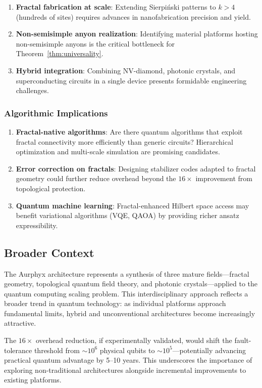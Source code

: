 \begin{enumerate}
\item \textbf{Fractal fabrication at scale}: Extending Sierpi\'{n}ski patterns to $k > 4$ (hundreds of sites) requires advances in nanofabrication precision and yield.

\item \textbf{Non-semisimple anyon realization}: Identifying material platforms hosting non-semisimple anyons is the critical bottleneck for Theorem~\ref{thm:universality}.

\item \textbf{Hybrid integration}: Combining NV-diamond, photonic crystals, and superconducting circuits in a single device presents formidable engineering challenges.
\end{enumerate}

\subsubsection{Algorithmic Implications}

\begin{enumerate}
\item \textbf{Fractal-native algorithms}: Are there quantum algorithms that exploit fractal connectivity more efficiently than generic circuits? Hierarchical optimization and multi-scale simulation are promising candidates.

\item \textbf{Error correction on fractals}: Designing stabilizer codes adapted to fractal geometry could further reduce overhead beyond the $16\times$ improvement from topological protection.

\item \textbf{Quantum machine learning}: Fractal-enhanced Hilbert space access may benefit variational algorithms (VQE, QAOA) by providing richer ansatz expressibility.
\end{enumerate}

\subsection{Broader Context}

The Aurphyx architecture represents a synthesis of three mature fields—fractal geometry, topological quantum field theory, and photonic crystals—applied to the quantum computing scaling problem. This interdisciplinary approach reflects a broader trend in quantum technology: as individual platforms approach fundamental limits, hybrid and unconventional architectures become increasingly attractive.

The $16\times$ overhead reduction, if experimentally validated, would shift the fault-tolerance threshold from $\sim 10^6$ physical qubits to $\sim 10^5$—potentially advancing practical quantum advantage by 5--10 years. This underscores the importance of exploring non-traditional architectures alongside incremental improvements to existing platforms.
